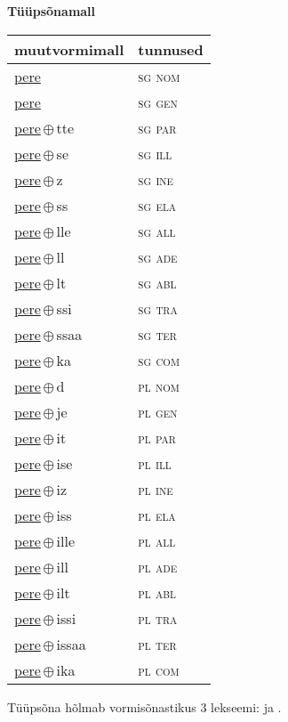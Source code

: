 

\vspace{3.5em}
\noindent \begin{minipage}{\textwidth}
\noindent \textbf{Tüüpsõnamall \,}\\

\begin{sideways}
\begin{tabular}{l l}
muutvormimall & tunnused \\
\hline
\underline{pere} & \textsc{ sg nom } \\
\underline{pere} & \textsc{ sg gen } \\
\underline{pere}\,$\oplus$\,tte & \textsc{ sg par } \\
\underline{pere}\,$\oplus$\,se & \textsc{ sg ill } \\
\underline{pere}\,$\oplus$\,z & \textsc{ sg ine } \\
\underline{pere}\,$\oplus$\,ss & \textsc{ sg ela } \\
\underline{pere}\,$\oplus$\,lle & \textsc{ sg all } \\
\underline{pere}\,$\oplus$\,ll & \textsc{ sg ade } \\
\underline{pere}\,$\oplus$\,lt & \textsc{ sg abl } \\
\underline{pere}\,$\oplus$\,ssi & \textsc{ sg tra } \\
\underline{pere}\,$\oplus$\,ssaa & \textsc{ sg ter } \\
\underline{pere}\,$\oplus$\,ka & \textsc{ sg com } \\
\underline{pere}\,$\oplus$\,d & \textsc{ pl nom } \\
\underline{pere}\,$\oplus$\,je & \textsc{ pl gen } \\
\underline{pere}\,$\oplus$\,it & \textsc{ pl par } \\
\underline{pere}\,$\oplus$\,ise & \textsc{ pl ill } \\
\underline{pere}\,$\oplus$\,iz & \textsc{ pl ine } \\
\underline{pere}\,$\oplus$\,iss & \textsc{ pl ela } \\
\underline{pere}\,$\oplus$\,ille & \textsc{ pl all } \\
\underline{pere}\,$\oplus$\,ill & \textsc{ pl ade } \\
\underline{pere}\,$\oplus$\,ilt & \textsc{ pl abl } \\
\underline{pere}\,$\oplus$\,issi & \textsc{ pl tra } \\
\underline{pere}\,$\oplus$\,issaa & \textsc{ pl ter } \\
\underline{pere}\,$\oplus$\,ika & \textsc{ pl com } \\
\end{tabular}
\end{sideways}
\label{tab:tüüpsõnamall-pere}

\end{minipage}

 
\vspace{1em}
\noindent Tüüpsõna hõlmab vormisõnastikus 3 lekseemi:  ja .
